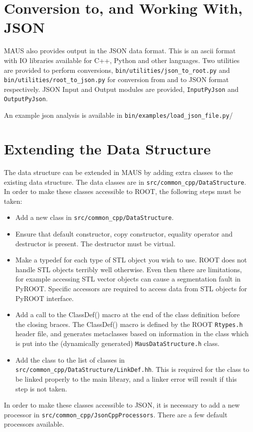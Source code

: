 \section{Conversion to, and Working With, JSON}
MAUS also provides output in the JSON data format. This is an ascii format with IO libraries available for C++, Python and other languages. Two utilities are provided to perform conversions, \verb|bin/utilities/json_to_root.py| and \verb|bin/utilities/root_to_json.py| for conversion from and to JSON format respectively. JSON Input and Output modules are provided, \verb|InputPyJson| and \verb|OutputPyJson|.

An example json analysis is available in \verb|bin/examples/load_json_file.py|/

\section{Extending the Data Structure}
The data structure can be extended in MAUS by adding extra classes to the existing data structure. The data classes are in \verb|src/common_cpp/DataStructure|. In order to make these classes accessible to ROOT, the following steps must be taken:
\begin{itemize}
\item Add a new class in \verb|src/common_cpp/DataStructure|.
\item Ensure that default constructor, copy constructor, equality operator and destructor is present. The destructor must be virtual.
\item Make a typedef for each type of STL object you wish to use. ROOT does not handle STL objects terribly well otherwise. Even then there are limitations, for example accessing STL vector objects can cause a segmentation fault in PyROOT. Specific accessors are required to access data from STL objects for PyROOT interface.
\item Add a call to the ClassDef() macro at the end of the class definition before the closing braces. The ClassDef() macro is defined by the ROOT \verb|Rtypes.h| header file, and generates metaclasses based on information in the class which is put into the (dynamically generated) \verb|MausDataStructure.h| class.
\item Add the class to the list of classes in \verb|src/common_cpp/DataStructure/LinkDef.hh|. This is required for the class to be linked properly to the main library, and a linker error will result if this step is not taken.
\end{itemize}
In order to make these classes accessible to JSON, it is necessary to add a new processor in \verb|src/common_cpp/JsonCppProcessors|. There are a few default processors available.
